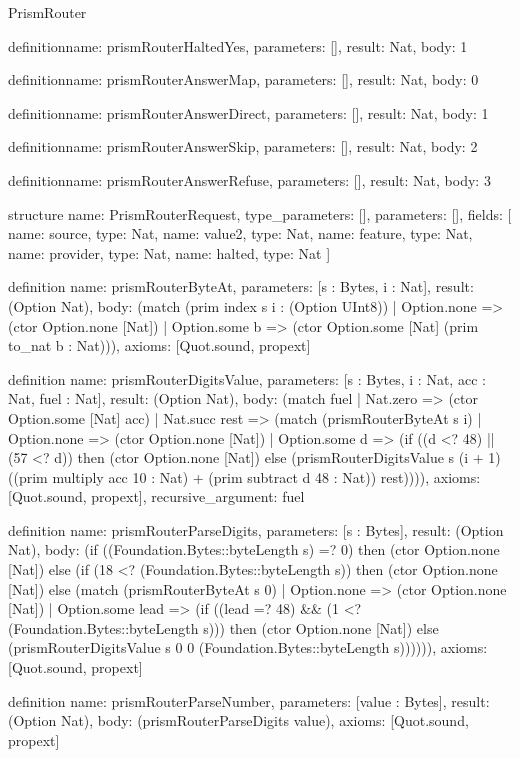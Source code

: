 \begin{lexlean}{PrismRouter}
\begin{semanticmodule}
definition{name: prismRouterHaltedYes, parameters: [], result: Nat, body: 1}

definition{name: prismRouterAnswerMap, parameters: [], result: Nat, body: 0}

definition{name: prismRouterAnswerDirect, parameters: [], result: Nat, body: 1}

definition{name: prismRouterAnswerSkip, parameters: [], result: Nat, body: 2}

definition{name: prismRouterAnswerRefuse, parameters: [], result: Nat, body: 3}

structure{
  name: PrismRouterRequest,
  type_parameters: [],
  parameters: [],
  fields: [
    {name: source, type: Nat},
    {name: value2, type: Nat},
    {name: feature, type: Nat},
    {name: provider, type: Nat},
    {name: halted, type: Nat}
  ]
}

definition{
  name: prismRouterByteAt,
  parameters: [s : Bytes, i : Nat],
  result: (Option Nat),
  body: (match (prim index s i : (Option UInt8))
    | Option.none => (ctor Option.none [Nat])
    | Option.some b => (ctor Option.some [Nat] (prim to_nat b : Nat))),
  axioms: [Quot.sound, propext]
}

definition{
  name: prismRouterDigitsValue,
  parameters: [s : Bytes, i : Nat, acc : Nat, fuel : Nat],
  result: (Option Nat),
  body: (match fuel
    | Nat.zero => (ctor Option.some [Nat] acc)
    | Nat.succ rest => (match (prismRouterByteAt s i)
      | Option.none => (ctor Option.none [Nat])
      | Option.some d => (if ((d <? 48) || (57 <? d)) then (ctor Option.none [Nat]) else (prismRouterDigitsValue s (i + 1) ((prim multiply acc 10 : Nat) + (prim subtract d 48 : Nat)) rest)))),
  axioms: [Quot.sound, propext],
  recursive_argument: fuel
}

definition{
  name: prismRouterParseDigits,
  parameters: [s : Bytes],
  result: (Option Nat),
  body: (if ((Foundation.Bytes::byteLength s) =? 0) then (ctor Option.none [Nat]) else (if (18 <? (Foundation.Bytes::byteLength s)) then (ctor Option.none [Nat]) else (match (prismRouterByteAt s 0)
    | Option.none => (ctor Option.none [Nat])
    | Option.some lead => (if ((lead =? 48) && (1 <? (Foundation.Bytes::byteLength s))) then (ctor Option.none [Nat]) else (prismRouterDigitsValue s 0 0 (Foundation.Bytes::byteLength s)))))),
  axioms: [Quot.sound, propext]
}

definition{
  name: prismRouterParseNumber,
  parameters: [value : Bytes],
  result: (Option Nat),
  body: (prismRouterParseDigits value),
  axioms: [Quot.sound, propext]
}


\end{semanticmodule}
\end{lexlean}
